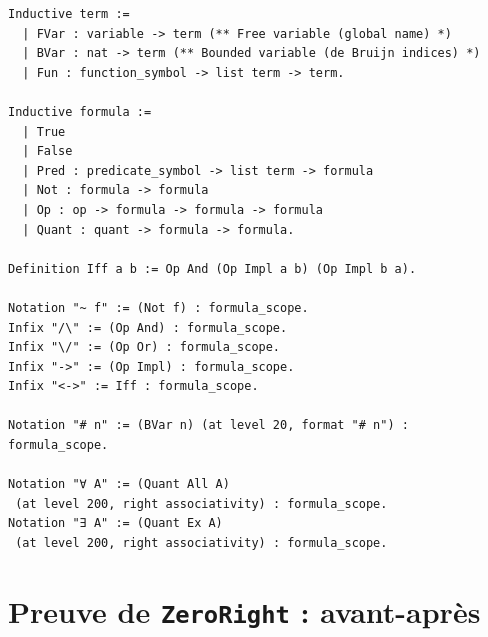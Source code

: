 \documentclass[a4paper]{article}
\theoremstyle{remark}
\theoremstyle{remark}
\theoremstyle{remark}
\theoremstyle{definition}
\theoremstyle{definition}
\theoremstyle{definition}
\begin{document}
\begin{verbatim}
Inductive term :=
  | FVar : variable -> term (** Free variable (global name) *)
  | BVar : nat -> term (** Bounded variable (de Bruijn indices) *)
  | Fun : function_symbol -> list term -> term.

Inductive formula :=
  | True
  | False
  | Pred : predicate_symbol -> list term -> formula
  | Not : formula -> formula
  | Op : op -> formula -> formula -> formula
  | Quant : quant -> formula -> formula.
  
Definition Iff a b := Op And (Op Impl a b) (Op Impl b a). 

Notation "~ f" := (Not f) : formula_scope.
Infix "/\" := (Op And) : formula_scope.
Infix "\/" := (Op Or) : formula_scope.
Infix "->" := (Op Impl) : formula_scope.
Infix "<->" := Iff : formula_scope.

Notation "# n" := (BVar n) (at level 20, format "# n") : formula_scope.

Notation "∀ A" := (Quant All A)
 (at level 200, right associativity) : formula_scope.
Notation "∃ A" := (Quant Ex A)
 (at level 200, right associativity) : formula_scope.
\end{verbatim}

\section{Preuve de \texttt{ZeroRight} : avant-après}\label{beforeafter_zeroright}
\end{document}
